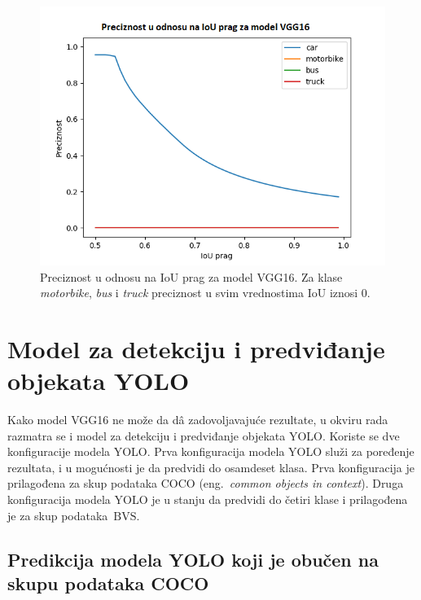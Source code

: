 \documentclass[12pt,oneside]{memoir}
\newcommand{\bvs}{\ensuremath{\,\textrm{BVS}}}
\begin{document}
\begin{figure}[!ht]
    \centering
    \includegraphics[width=1\textwidth]{matfmaster/glava4/precision_vs_iou_threshold_VGG16.png}
    \caption{Preciznost u odnosu na IoU prag za model VGG16. Za klase \textit{motorbike}, \textit{bus} i \textit{truck} preciznost u svim vrednostima IoU iznosi 0.}
    \label{fig:section4_vgg16_prc}
\end{figure}





\clearpage
\section{Model za detekciju i predviđanje objekata YOLO}

Kako model VGG16 ne može da d\^{a} zadovoljavajuće rezultate, u okviru rada razmatra se i model za detekciju i predviđanje objekata YOLO. Koriste se dve konfiguracije modela YOLO. Prva konfiguracija modela YOLO služi za poređenje rezultata, i u mogućnosti je da predvidi do osamdeset klasa. Prva konfiguracija je prilagođena za skup podataka COCO (eng.~\textit{common objects in context}). Druga konfiguracija modela YOLO je u stanju da predvidi do četiri klase i prilagođena je za skup podataka \bvs.


\subsection{Predikcija modela YOLO koji je obučen na skupu podataka COCO}
\end{document}
